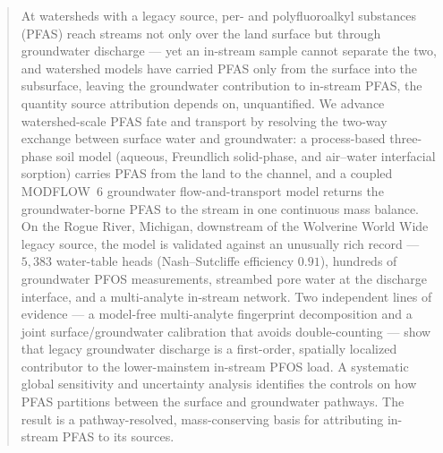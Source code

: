 \begin{abstract}
At watersheds with a legacy source, per- and polyfluoroalkyl substances (PFAS) reach streams not only
over the land surface but through groundwater discharge --- yet an in-stream sample cannot separate the
two, and watershed models have carried PFAS only from the surface into the subsurface, leaving the
groundwater contribution to in-stream PFAS, the quantity source attribution depends on, unquantified.
We advance watershed-scale PFAS fate and transport by resolving the two-way exchange between surface
water and groundwater: a process-based three-phase soil model (aqueous, Freundlich solid-phase, and
air--water interfacial sorption) carries PFAS from the land to the channel, and a coupled MODFLOW~6
groundwater flow-and-transport model returns the groundwater-borne PFAS to the stream in one continuous
mass balance. On the Rogue River, Michigan, downstream of the Wolverine World Wide legacy source, the
model is validated against an unusually rich record --- $5{,}383$ water-table heads (Nash--Sutcliffe
efficiency $0.91$), hundreds of groundwater PFOS measurements, streambed pore water at the discharge
interface, and a multi-analyte in-stream network. Two independent lines of evidence --- a model-free
multi-analyte fingerprint decomposition and a joint surface/groundwater calibration that avoids
double-counting --- show that legacy groundwater discharge is a first-order, spatially localized
contributor to the lower-mainstem in-stream PFOS load. A systematic global sensitivity and uncertainty
analysis identifies the controls on how PFAS partitions between the surface and groundwater pathways.
The result is a pathway-resolved, mass-conserving basis for attributing in-stream PFAS to its sources.
\end{abstract}
